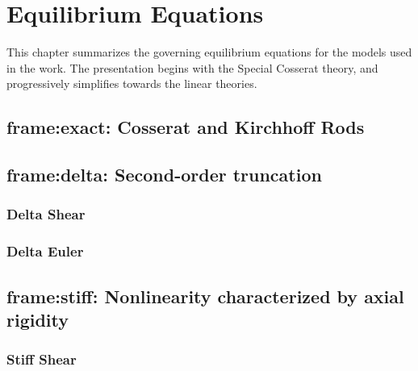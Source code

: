 \begingroup
\newcommand{\tp}[1]{#1^{\top}}
\newcommand{\FrameYi}{y}
\newcommand{\FrameZi}{z}
\newcommand{\SpaceRotation}{\bm{R}}
\newcommand{\FramePosition}{\bm{x}}

\chapter{Equilibrium Equations}\label{ch:frame-hierarchy} 
%
This chapter summarizes the governing equilibrium equations for the models used in the work. 
The presentation begins with the Special Cosserat theory, and progressively simplifies towards the linear theories.


\section{\Gls{frame:exact}: Cosserat and Kirchhoff Rods}\label{sec:cosserat}

% 

\iffalse
\section{\Gls{frame:delta}: Second-order truncation}

\subsection{ Delta Shear }

\clearpage
\subsection{ Delta Euler }

\clearpage
\section{\Gls{frame:stiff}: Nonlinearity characterized by axial rigidity %
}\label{sec:stiff}

\subsection{ Stiff Shear }

\clearpage 
